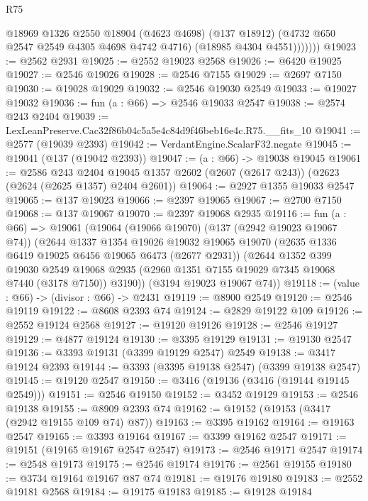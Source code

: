 \begin{lexlean}{R75}
\begin{coremodule}
              @18969
                @1326
                @2550
                @18904
                (@4623 @4698)
                (@137 @18912)
                (@4732 @650 @2547 @2549 @4305 @4698 @4742 @4716)
                (@18985 @4304 @4551)))))))
@19023 := @2562 @2931
@19025 := @2552 @19023 @2568
@19026 := @6420 @19025
@19027 := @2546 @19026
@19028 := @2546 @7155
@19029 := @2697 @7150
@19030 := @19028 @19029
@19032 := @2546 @19030 @2549
@19033 := @19027 @19032
@19036 := fun (a : @66) => @2546 @19033 @2547
@19038 := @2574 @243 @2404
@19039 := LexLeanPreserve.Cac32f86b04c5a5e4c84d9f46beb16e4c.R75.__fits_10
@19041 := @2577 (@19039 @2393)
@19042 := VerdantEngine.ScalarF32.negate
@19045 := @19041 (@137 (@19042 @2393))
@19047 := (a : @66) -> @19038 @19045
@19061 := @2586
    @243
    @2404
    @19045
    @1357
    @2602
    (@2607 (@2617 @243))
    (@2623 (@2624 (@2625 @1357) @2404 @2601))
@19064 := @2927 @1355 @19033 @2547
@19065 := @137 @19023
@19066 := @2397 @19065
@19067 := @2700 @7150
@19068 := @137 @19067
@19070 := @2397 @19068 @2935
@19116 := fun (a : @66) =>
  @19061
    (@19064
      (@19066 @19070)
      (@137 (@2942 @19023 @19067 @74))
      (@2644
        @1337
        @1354
        @19026
        @19032
        @19065
        @19070
        (@2635 @1336 @6419 @19025 @6456 @19065 @6473 (@2677 @2931))
        (@2644
          @1352
          @399
          @19030
          @2549
          @19068
          @2935
          (@2960 @1351 @7155 @19029 @7345 @19068 @7440 (@3178 @7150))
          @3190))
      (@3194 @19023 @19067 @74))
@19118 := (value : @66) -> (divisor : @66) -> @2431
@19119 := @8900 @2549
@19120 := @2546 @19119
@19122 := @8608 @2393 @74
@19124 := @2829 @19122 @109
@19126 := @2552 @19124 @2568
@19127 := @19120 @19126
@19128 := @2546 @19127
@19129 := @4877 @19124
@19130 := @3395 @19129
@19131 := @19130 @2547
@19136 := @3393 @19131 (@3399 @19129 @2547) @2549
@19138 := @3417 @19124 @2393
@19144 := @3393 (@3395 @19138 @2547) (@3399 @19138 @2547)
@19145 := @19120 @2547
@19150 := @3416 (@19136 (@3416 (@19144 @19145 @2549)))
@19151 := @2546 @19150
@19152 := @3452 @19129
@19153 := @2546 @19138
@19155 := @8909 @2393 @74
@19162 := @19152 (@19153 (@3417 (@2942 @19155 @109 @74) @87))
@19163 := @3395 @19162
@19164 := @19163 @2547
@19165 := @3393 @19164
@19167 := @3399 @19162 @2547
@19171 := @19151 (@19165 @19167 @2547 @2547)
@19173 := @2546 @19171 @2547
@19174 := @2548 @19173
@19175 := @2546 @19174
@19176 := @2561 @19155
@19180 := @3734 @19164 @19167 @87 @74
@19181 := @19176 @19180
@19183 := @2552 @19181 @2568
@19184 := @19175 @19183
@19185 := @19128 @19184

\end{coremodule}
\end{lexlean}
